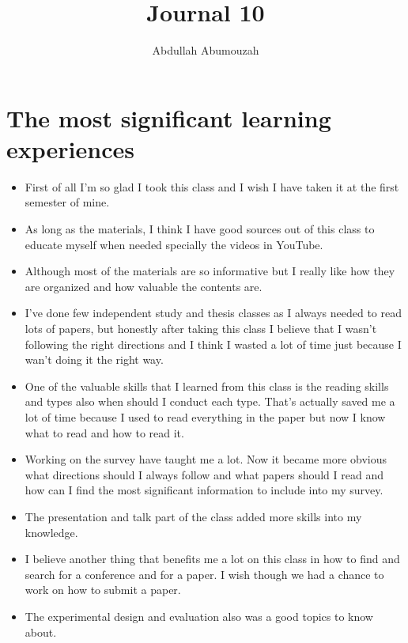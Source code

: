 \documentclass{article}
\title{Journal 10}
\author{Abdullah Abumouzah }
\begin{document}
\maketitle

\section{The most significant learning experiences}
\begin{itemize}
    \item First of all I'm so glad I took this class and  I wish I have taken it at the first semester of mine. 
    \item As long as the materials, I think I have good sources out of this class to educate myself when needed specially the videos in YouTube. 
    
    \item Although most of the materials are so informative but I really like how they are organized and how valuable the contents are.  
    \item I've done few independent study and thesis classes as I always needed to read lots of papers, but honestly after taking this class I believe that I wasn't following the right directions and I think I wasted a lot of time just because I wan't doing it the right way.    
    \item One of the valuable skills that I learned from this class is the reading skills and types also when should I conduct each type. That's actually saved me a lot of time because I used to read everything in the paper but now I know what to read and how to read it. 
    \item Working on the survey have taught me a lot. Now it became more obvious what directions should I always follow and what papers should I read and how can I find the most significant information to include into my survey.  
    
    \item The presentation and talk part of the class added more skills into my knowledge. 
    
    \item I believe another thing that benefits me a lot on this class in how to find and search for a conference and for a paper. I wish though we had a chance to work on how to submit a paper.
    
    \item The experimental design and evaluation also was a good topics to know about.  
    

\end{itemize}
\end{document}
